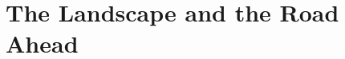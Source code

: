 \documentclass[11pt,a4paper,twoside,openright]{book}
\begin{document}
\part{The Landscape and the Road Ahead}




\appendix






\backmatter
\printbibliography[heading=bibintoc]
\printindex
\end{document}
